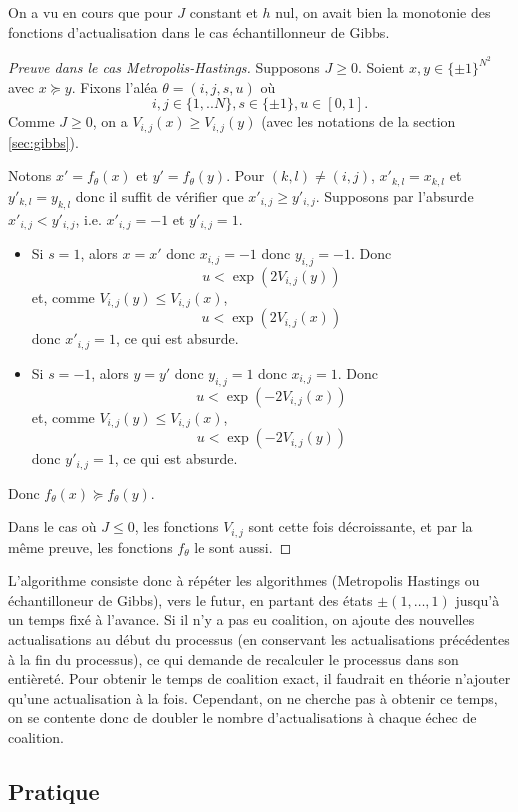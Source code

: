 \documentclass[a4paper,11pt]{article}
\begin{document}
On a vu en cours que pour $J$ constant et $h$ nul, on avait bien la monotonie des fonctions d'actualisation dans le cas échantillonneur de Gibbs.

\begin{proof}[Preuve dans le cas Metropolis-Hastings]
Supposons $J \geq 0$. Soient $x,y \in  \{ \pm 1 \} ^{N^2}$ avec $x \succcurlyeq y$. Fixons l'aléa $\theta = (i,j,s,u)$ où
$$i,j \in \{1,..N\}, s \in \{\pm 1\}, u\in [0,1].$$
Comme $J \geq 0$, on a $V_{i,j}(x) \geq V_{i,j}(y)$ (avec les notations de la section \ref{sec:gibbs}).

Notons $x'=f_\theta(x)$ et $y' = f_\theta(y)$. Pour $(k,l) \neq (i,j)$, $x'_{k,l} = x_{k,l}$ et $y'_{k,l} = y_{k,l}$ donc il suffit de vérifier que $x'_{i,j} \geq y'_{i,j}$. Supposons par l'absurde $x'_{i,j} < y'_{i,j}$, i.e. $x'_{i,j} = -1$ et $y'_{i,j} = 1$.
\begin{itemize}
	\item Si $s=1$, alors $x = x'$ donc $x_{i,j} = -1$ donc $y_{i,j} = -1$. Donc
	$$u < \exp(2V_{i,j}(y))$$
	et, comme $V_{i,j}(y) \leq V_{i,j}(x)$,
	$$u < \exp(2V_{i,j}(x))$$
	donc $x'_{i,j} = 1$, ce qui est absurde.
	\item Si $s=-1$, alors $y = y'$ donc $y_{i,j} = 1$ donc $x_{i,j} = 1$. Donc
	$$u < \exp(-2V_{i,j}(x))$$
	et, comme $V_{i,j}(y) \leq V_{i,j}(x)$,
	$$u < \exp(-2V_{i,j}(y))$$
	donc $y'_{i,j} = 1$, ce qui est absurde.
\end{itemize}
Donc $f_{\theta}(x) \succcurlyeq f_{\theta}(y)$.

Dans le cas où $J \leq 0$, les fonctions $V_{i,j}$ sont cette fois décroissante, et par la même preuve, les fonctions $f_\theta$ le sont aussi.
\end{proof}

L'algorithme consiste donc à répéter les algorithmes (Metropolis Hastings ou échantilloneur de Gibbs), vers le futur, en partant des états $\pm(1,\hdots,1)$  jusqu'à un temps fixé à l'avance. Si il n'y a pas eu coalition, on ajoute des nouvelles actualisations au début du processus (en conservant les actualisations précédentes à la fin du processus), ce qui demande de recalculer le processus dans son entièreté. Pour obtenir le temps de coalition exact, il faudrait en théorie n'ajouter qu'une actualisation à la fois. Cependant, on ne cherche pas à obtenir ce temps, on se contente donc de doubler le nombre d'actualisations à chaque échec de coalition.

\subsection{Pratique}
\end{document}
